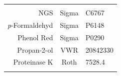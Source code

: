 \documentclass[11pt,singlespacinge,twoside]{reedthesis} %
\begin{document}
\begin{longtable}[]{@{}rcl@{}}
\begin{minipage}[t]{0.16\columnwidth}
\strut
\end{minipage}\tabularnewline
\begin{minipage}[t]{0.26\columnwidth}\raggedleft
NGS\strut
\end{minipage} & \begin{minipage}[t]{0.50\columnwidth}\centering
Sigma\strut
\end{minipage} & \begin{minipage}[t]{0.16\columnwidth}\raggedright
C6767\strut
\end{minipage}\tabularnewline
\begin{minipage}[t]{0.26\columnwidth}\raggedleft
\emph{p}-Formaldehyd\strut
\end{minipage} & \begin{minipage}[t]{0.50\columnwidth}\centering
Sigma\strut
\end{minipage} & \begin{minipage}[t]{0.16\columnwidth}\raggedright
P6148\strut
\end{minipage}\tabularnewline
\begin{minipage}[t]{0.26\columnwidth}\raggedleft
Phenol Red\strut
\end{minipage} & \begin{minipage}[t]{0.50\columnwidth}\centering
Sigma\strut
\end{minipage} & \begin{minipage}[t]{0.16\columnwidth}\raggedright
P0290\strut
\end{minipage}\tabularnewline
\begin{minipage}[t]{0.26\columnwidth}\raggedleft
Propan-2-ol\strut
\end{minipage} & \begin{minipage}[t]{0.50\columnwidth}\centering
VWR\strut
\end{minipage} & \begin{minipage}[t]{0.16\columnwidth}\raggedright
20842330\strut
\end{minipage}\tabularnewline
\begin{minipage}[t]{0.26\columnwidth}\raggedleft
Proteinase K\strut
\end{minipage} & \begin{minipage}[t]{0.50\columnwidth}\centering
Roth\strut
\end{minipage} & \begin{minipage}[t]{0.16\columnwidth}\raggedright
7528.4\strut
\end{minipage}\tabularnewline
\begin{minipage}[t]{0.26\columnwidth}\raggedleft

\end{minipage}
\end{longtable}
\end{document}
